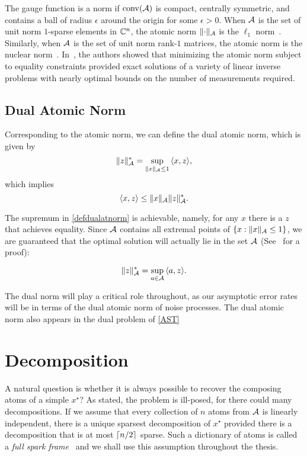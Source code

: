 The gauge function is a norm if $\operatorname{conv}(\mathcal{A})$ is compact, centrally symmetric,
and contains a ball of radius $\epsilon$ around the origin for some
$\epsilon>0$. When $\mathcal{A}$ is the set of unit norm $1$-sparse elements in $\mathbb{C}^n$,
the atomic norm $\lVert\cdot\rVert_{\mathcal{A}}$ is the $\ell_1$ norm~\cite{candes06}.
Similarly, when $\mathcal{A}$ is the set of unit norm rank-$1$ matrices, the atomic norm
is the nuclear norm~\cite{Recht10}. In~\cite{crpw}, the authors showed that
minimizing the atomic norm subject to equality constraints provided exact
solutions of a variety of linear inverse problems with nearly optimal bounds on
the number of measurements required.

\subsection{Dual Atomic Norm}

Corresponding to the atomic norm, we can define the dual atomic norm, which is given by
\begin{equation}
  \label{defdualatnorm}
  \lVert z\rVert_{\mathcal{A}}^* = \sup_{\lVert x\rVert_{\mathcal{A}} \leq 1}{\langle x, z\rangle},
\end{equation}
which implies
\begin{equation}
  \label{holder}
  \langle x, z\rangle \leq \lVert x\rVert_{\mathcal{A}} \lVert z\rVert_{\mathcal{A}}^*.
\end{equation}

The supremum in \eqref{defdualatnorm} is achievable, namely, for any $x$ there
is a $z$ that achieves equality. Since $\mathcal{A}$ contains all extremal points of
$\{x: \|x\|_{\mathcal{A}} \leq 1\}$, we are guaranteed that the optimal solution will
actually lie in the set $\mathcal{A}$ (See~\cite{bonsall} for a proof):

\begin{equation}
\lVert z\rVert_{\mathcal{A}}^* = \sup_{a \in \mathcal{A}}{\langle a, z\rangle}.\label{bonsall}
\end{equation}

The dual norm will play a critical role throughout, as our asymptotic error
rates will be in terms of the dual atomic norm of noise processes. The dual
atomic norm also appears in the dual problem of \eqref{AST} 

\section{Decomposition}
\label{sec:decomposition}

A natural question is whether it is always possible to recover the composing
atoms of a simple $x^\star$? As stated, the problem is ill-posed, for there
could many decompositions. If we assume that every collection of $n$ atoms from
$\mathcal{A}$ is linearly independent, there is a unique sparsest decomposition of
$x^\star$ provided there is a decomposition that is at most $\lceil n/2\rceil$ sparse.
Such a dictionary of atoms is called a \emph{full spark frame}~\cite{spark} and
we shall use this assumption throughout the thesis.

